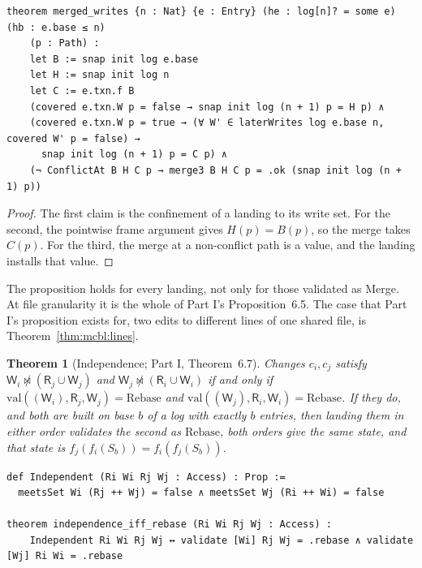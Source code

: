 \documentclass[11pt,letterpaper]{article}
\newtheorem{theorem}{Theorem}[section]
\theoremstyle{definition}
\theoremstyle{remark}
\newcommand{\R}{\mathsf{R}}
\newcommand{\W}{\mathsf{W}}
\newcommand{\Snap}[1]{S_{#1}}
\newcommand{\nmeets}{\not\bowtie}
\newcommand{\op}[1]{\mathrm{#1}}
\newcommand{\val}{\op{val}}
\newcommand{\Rb}{\mathrm{Rebase}}
\begin{document}
\begin{lstlisting}[language=Lean,caption={Merged writes at file level (\texttt{YonedaTx/Serializability.lean})},label={lst:mcbl:merged}]
theorem merged_writes {n : Nat} {e : Entry} (he : log[n]? = some e) (hb : e.base ≤ n)
    (p : Path) :
    let B := snap init log e.base
    let H := snap init log n
    let C := e.txn.f B
    (covered e.txn.W p = false → snap init log (n + 1) p = H p) ∧
    (covered e.txn.W p = true → (∀ W' ∈ laterWrites log e.base n, covered W' p = false) →
      snap init log (n + 1) p = C p) ∧
    (¬ ConflictAt B H C p → merge3 B H C p = .ok (snap init log (n + 1) p))
\end{lstlisting}

\begin{proof}
The first claim is the confinement of a landing to its write set. For the second, the pointwise frame argument gives $H(p)=B(p)$, so the merge takes $C(p)$. For the third, the merge at a non-conflict path is a value, and the landing installs that value.
\end{proof}

The proposition holds for every landing, not only for those validated as Merge. At file granularity it is the whole of Part I's Proposition~6.5. The case that Part I's proposition exists for, two edits to different lines of one shared file, is Theorem~\ref{thm:mcbl:lines}.

\begin{theorem}[Independence; Part I, Theorem~6.7]
\label{thm:mcbl:indep}
Changes $c_i,c_j$ satisfy $\W_i\nmeets(\R_j\cup\W_j)$ and $\W_j\nmeets(\R_i\cup\W_i)$ if and only if $\val((\W_i),\R_j,\W_j)=\Rb$ and $\val((\W_j),\R_i,\W_i)=\Rb$. If they do, and both are built on base $b$ of a log with exactly $b$ entries, then landing them in either order validates the second as $\Rb$, both orders give the same state, and that state is $f_j(f_i(\Snap{b}))=f_i(f_j(\Snap{b}))$.
\end{theorem}

\begin{lstlisting}[language=Lean,caption={Independence at validation (\texttt{YonedaTx/Validation.lean})},label={lst:mcbl:indepval}]
def Independent (Ri Wi Rj Wj : Access) : Prop :=
  meetsSet Wi (Rj ++ Wj) = false ∧ meetsSet Wj (Ri ++ Wi) = false

theorem independence_iff_rebase (Ri Wi Rj Wj : Access) :
    Independent Ri Wi Rj Wj ↔ validate [Wi] Rj Wj = .rebase ∧ validate [Wj] Ri Wi = .rebase
\end{lstlisting}
\end{document}
